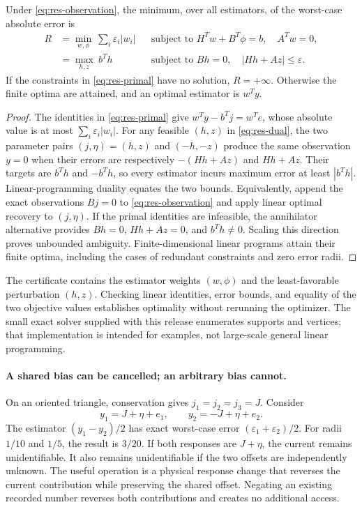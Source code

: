 \begin{theorem}
\label{thm:res-nuisance}
Under \eqref{eq:res-observation}, the minimum, over all estimators, of the
worst-case absolute error is
\begin{align}
 R
 &=\min_{w,\phi}\ \sum_i\varepsilon_i|w_i|
 &&\text{subject to }H^Tw+B^T\phi=b,\quad A^Tw=0,
 \label{eq:res-primal}\\
 &=\max_{h,z}\ b^Th
 &&\text{subject to }Bh=0,\quad |Hh+Az|\leq\varepsilon.
 \label{eq:res-dual}
\end{align}
If the constraints in \eqref{eq:res-primal} have no solution, $R=+\infty$.
Otherwise the finite optima are attained, and an optimal estimator is $w^Ty$.
\end{theorem}

\begin{proof}
The identities in \eqref{eq:res-primal} give
$w^Ty-b^Tj=w^Te$, whose absolute value is at most
$\sum_i\varepsilon_i|w_i|$. For any feasible $(h,z)$ in
\eqref{eq:res-dual}, the two parameter pairs $(j,\eta)=(h,z)$ and $(-h,-z)$
produce the same observation $y=0$ when their errors are respectively
$-(Hh+Az)$ and $Hh+Az$. Their targets are $b^Th$ and $-b^Th$, so every
estimator incurs maximum error at least $|b^Th|$. Linear-programming duality
equates the two bounds. Equivalently, append the exact observations $Bj=0$
to \eqref{eq:res-observation} and apply linear optimal recovery to $(j,\eta)$.
If the primal identities are infeasible, the annihilator alternative provides
$Bh=0$, $Hh+Az=0$, and $b^Th\ne0$. Scaling this direction proves unbounded
ambiguity. Finite-dimensional linear programs attain their finite optima,
including the cases of redundant constraints and zero error radii.
\end{proof}

The certificate contains the estimator weights $(w,\phi)$ and the
least-favorable perturbation $(h,z)$. Checking linear identities, error bounds,
and equality of the two objective values establishes optimality without
rerunning the optimizer. The small exact solver supplied with this release
enumerates supports and vertices; that implementation is intended for examples,
not large-scale general linear programming.

\paragraph{A shared bias can be cancelled; an arbitrary bias cannot.}
On an oriented triangle, conservation gives $j_1=j_2=j_3=J$. Consider
\[
 y_1=J+\eta+e_1,\qquad y_2=-J+\eta+e_2.
\]
The estimator $(y_1-y_2)/2$ has exact worst-case error
$(\varepsilon_1+\varepsilon_2)/2$. For radii $1/10$ and $1/5$, the result is
$3/20$. If both responses are $J+\eta$, the current remains unidentifiable.
It also remains unidentifiable if the two offsets are independently unknown.
The useful operation is a physical response change that reverses the current
contribution while preserving the shared offset. Negating an existing recorded
number reverses both contributions and creates no additional access.

